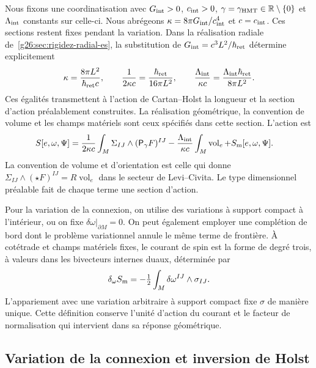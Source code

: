 Nous fixons une coordinatisation avec \(G_{\rm int}>0\), \(c_{\rm int}>0\), \(\gamma=\gamma_{\rm HMT}\in\mathbb R\setminus\{0\}\) et \(\Lambda_{\rm int}\) constants sur celle-ci. Nous abrégeons \(\kappa=8\pi G_{\rm int}/c_{\rm int}^4\) et \(c=c_{\rm int}\). Ces sections restent fixes pendant la variation. Dans la réalisation radiale de~\ref{g26:sec:rigidez-radial-es}, la substitution de \(G_{\rm int}=c^3L^2/\hbar_{\rm ret}\) détermine explicitement
\[
 \kappa=\frac{8\pi L^2}{\hbar_{\rm ret}c},\qquad
 \frac1{2\kappa c}=\frac{\hbar_{\rm ret}}{16\pi L^2},\qquad
 \frac{\Lambda_{\rm int}}{\kappa c}
   =\frac{\Lambda_{\rm int}\hbar_{\rm ret}}{8\pi L^2}.
\]
Ces égalités transmettent à l'action de Cartan--Holst la longueur et
la section d'action préalablement construites. La réalisation géométrique,
la convention de volume et les champs matériels sont ceux spécifiés
dans cette section. L'action est
\begin{equation}
 \begin{split}
 S[e,\omega,\Psi]={}&
 \frac1{2\kappa c}\int_M\Sigma_{IJ}\wedge
                         (\mathsf P_\gamma F)^{IJ}
 -\frac{\Lambda_{\rm int}}{\kappa c}
                         \int_M\operatorname{vol}_e
 +S_{\rm m}[e,\omega,\Psi].
 \end{split}
 \label{vii:eq:accion-cartan-holst}
\end{equation}
La convention de volume et d'orientation est celle qui donne
\(\Sigma_{IJ}\wedge(\star F)^{IJ}=R\operatorname{vol}_e\)
dans le secteur de Levi--Civita. Le type dimensionnel préalable fait de chaque
terme une section d'action.

Pour la variation de la connexion, on utilise des variations à support compact à l'intérieur, ou on fixe \(\delta\omega|_{\partial M}=0\). On peut également employer une complétion de bord dont le problème variationnel annule le même terme de frontière. À cotétrade et champs matériels fixes, le courant de spin est la forme de degré trois, à valeurs dans les bivecteurs internes duaux, déterminée par
\begin{equation}
 \delta_\omega S_{\rm m}
 =-\tfrac12\int_M\delta\omega^{IJ}\wedge\sigma_{IJ}.
 \label{vii:eq:corriente-variacional}
\end{equation}
L'appariement avec une variation arbitraire à support compact fixe
\(\sigma\) de manière unique. Cette définition conserve l'unité
d'action du courant et le facteur de normalisation qui intervient dans
sa réponse géométrique.

\subsection{Variation de la connexion et inversion de Holst}
\label{vii:subsec:variacion-holst}

